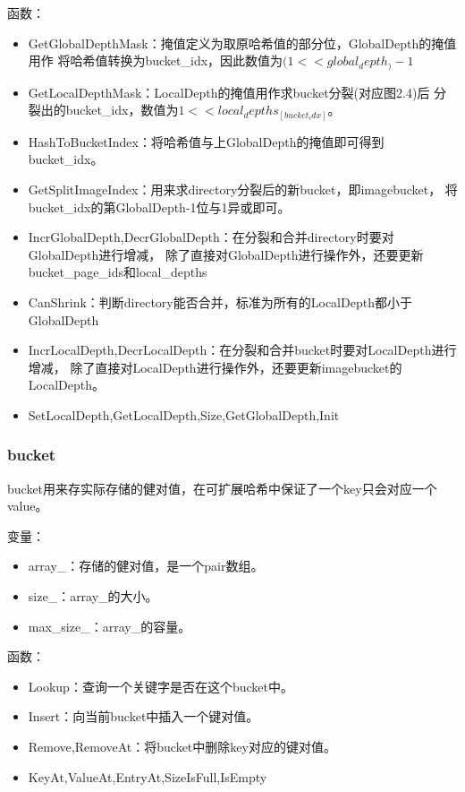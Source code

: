 \documentclass[a4paper]{article}
\begin{document}
函数：

\begin{itemize}
   \item GetGlobalDepthMask：掩值定义为取原哈希值的部分位，GlobalDepth的掩值用作
   将哈希值转换为bucket\_idx，因此数值为$(1 << global_depth_) - 1$
   \item GetLocalDepthMask：LocalDepth的掩值用作求bucket分裂(对应图2.4)后
   分裂出的bucket\_idx，数值为$1 << local_depths_[bucket_idx]$。
   \item HashToBucketIndex：将哈希值与上GlobalDepth的掩值即可得到bucket\_idx。
   \item GetSplitImageIndex：用来求directory分裂后的新bucket，即imagebucket，
   将bucket\_idx的第GlobalDepth-1位与1异或即可。
   \item IncrGlobalDepth,DecrGlobalDepth：在分裂和合并directory时要对GlobalDepth进行增减，
   除了直接对GlobalDepth进行操作外，还要更新bucket\_page\_ids和local\_depths
   \item CanShrink：判断directory能否合并，标准为所有的LocalDepth都小于GlobalDepth
   \item IncrLocalDepth,DecrLocalDepth：在分裂和合并bucket时要对LocalDepth进行增减，
   除了直接对LocalDepth进行操作外，还要更新imagebucket的LocalDepth。
   \item SetLocalDepth,GetLocalDepth,Size,GetGlobalDepth,Init
\end{itemize}

\subsubsection{bucket}

bucket用来存实际存储的健对值，在可扩展哈希中保证了一个key只会对应一个value。

变量：
\begin{itemize}
   \item array\_：存储的健对值，是一个pair数组。
   \item size\_：array\_的大小。
   \item max\_size\_：array\_的容量。
\end{itemize}

函数：

\begin{itemize}
   \item Lookup：查询一个关键字是否在这个bucket中。
   \item Insert：向当前bucket中插入一个键对值。
   \item Remove,RemoveAt：将bucket中删除key对应的键对值。
   \item KeyAt,ValueAt,EntryAt,SizeIsFull,IsEmpty
\end{itemize}
\end{document}
